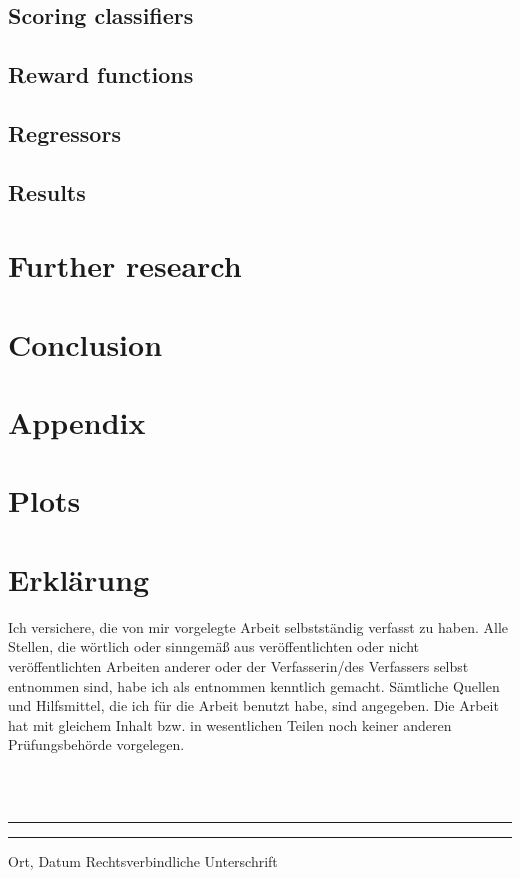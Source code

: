 \documentclass[twoside,11pt]{article}
\begin{document}
\subsection{Scoring classifiers}



\subsection{Reward functions}

\subsection{Regressors}

\subsection{Results}


%  


\section{Further research}
\label{sec:further_research}

\section{Conclusion}

\renewcommand{\appendixpagename}{}
\begin{appendices}
  \section*{Appendix}

  \section{Plots}

\end{appendices}



\newpage
\section*{Erklärung}
Ich versichere, die von mir vorgelegte Arbeit
selbstst\"andig verfasst zu haben.
Alle Stellen, die w\"ortlich oder sinngem\"a{\ss} aus
ver\"offentlichten oder nicht ver\"offentlichten Arbeiten
anderer oder der Verfasserin/des Verfassers selbst
entnommen sind, habe ich als entnommen kenntlich gemacht.
S\"amtliche Quellen und Hilfsmittel, die ich für die Arbeit
benutzt habe, sind angegeben.
Die Arbeit hat mit gleichem Inhalt bzw. in wesentlichen
Teilen noch keiner anderen Pr\"ufungsbeh\"orde vorgelegen.

~\\
~\\
\noindent
\rule{0.35\textwidth}{0.4pt}
\hspace*{3cm}
\rule{0.45\textwidth}{0.4pt}
\newline
Ort, Datum	\hspace*{6.3cm}	Rechtsverbindliche Unterschrift
\end{document}
